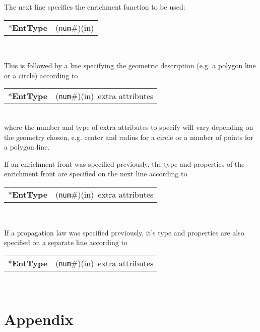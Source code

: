\documentclass[a4paper]{report}
\newcommand{\param}[1]{\texttt{#1}} %
\newcommand{\componentNum}{(\param{num}\#){\tiny(in)}} %
\newcommand{\entKeyword}[1]{*\textbf{#1}} %
\newenvironment{record}[1][]{\begin{tabular}{|ll}}{\end{tabular}\\}
\newcommand{\recentry}[2]{{#1}&{#2}\\}
\newcounter{rcc}
\newenvironment{record}[1][\textwidth]{\setcounter{rcc}{0}\rowcolors{1}{lightgray}{lightgray}\tabularx{#1}{llR} \hline}
               {\endtabularx}
\newcommand{\recentry}[2]{\ifthenelse{\value{rcc}>0}{$\backslash$ \\}{\setcounter{rcc}{1}}{#1}&{#2}&}
\begin{document}
The next line specifies the enrichment function to be used:\\
\noindent
\begin{record}
  \recentry{\entKeyword{EntType}}{\componentNum}
\end{record}

This is followed by a line specifying the geometric description (e.g. a polygon
line or a circle) according to\\
\noindent
\begin{record}
  \recentry{\entKeyword{EntType}}{\componentNum \ extra attributes}
\end{record}
where the number and type of extra attributes to specify will vary depending on the
geometry chosen, e.g. center and radius for a circle or a number of points for a
polygon line.

If an enrichment front was specified previously, the type and properties of the
enrichment front are specified on the next line according to\\
\noindent
\begin{record}
  \recentry{\entKeyword{EntType}}{\componentNum \ extra attributes}
\end{record}

If a propagation law was specified previously, it's type and properties are also
specified on a separate line according to\\
\noindent
\begin{record}
  \recentry{\entKeyword{EntType}}{\componentNum \ extra attributes}
\end{record}


\chapter{Appendix}
\end{document}
